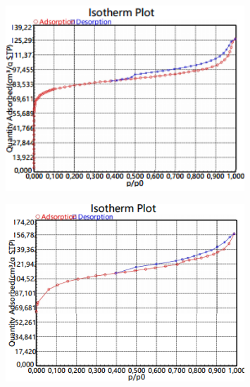 \begin{figure}[H]
	\centering
	\includegraphics[width=0.8\textwidth]{media/chem2/image21}
	\caption*{}
\end{figure}

\begin{figure}[H]
	\centering
	\includegraphics[width=0.8\textwidth]{media/chem2/image22}
	\caption*{}
\end{figure}


